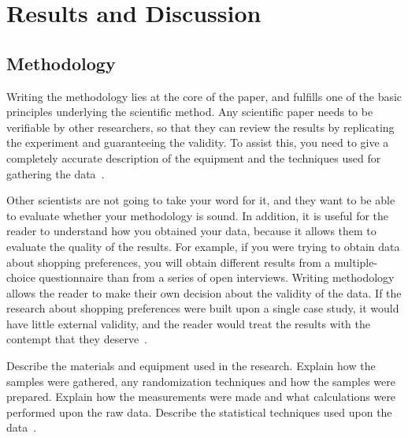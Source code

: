 \documentclass{winslabreport}
\begin{document}
\section{Results and Discussion}

\subsection{Methodology}
Writing the methodology lies at the core of the paper, and fulfills one of the basic principles underlying the scientific method. Any scientific paper needs to be verifiable by other researchers, so that they can review the results by replicating the experiment and guaranteeing the validity. To assist this, you need to give a completely accurate description of the equipment and the techniques used for gathering the data~\cite{Shuttleworth2016}.

Other scientists are not going to take your word for it, and they want to be able to evaluate whether your methodology is sound. In addition, it is useful for the reader to understand how you obtained your data, because it allows them to evaluate the quality of the results. For example, if you were trying to obtain data about shopping preferences, you will obtain different results from a multiple-choice questionnaire than from a series of open interviews. Writing methodology allows the reader to make their own decision about the validity of the data. If the research about shopping preferences were built upon a single case study, it would have little external validity, and the reader would treat the results with the contempt that they deserve~\cite{Shuttleworth2016}.

Describe the materials and equipment used in the research. Explain how the samples were gathered, any randomization techniques and how the samples were prepared. Explain how the measurements were made and what calculations were performed upon the raw data. Describe the statistical techniques used upon the data~\cite{Shuttleworth2016}.
\end{document}
